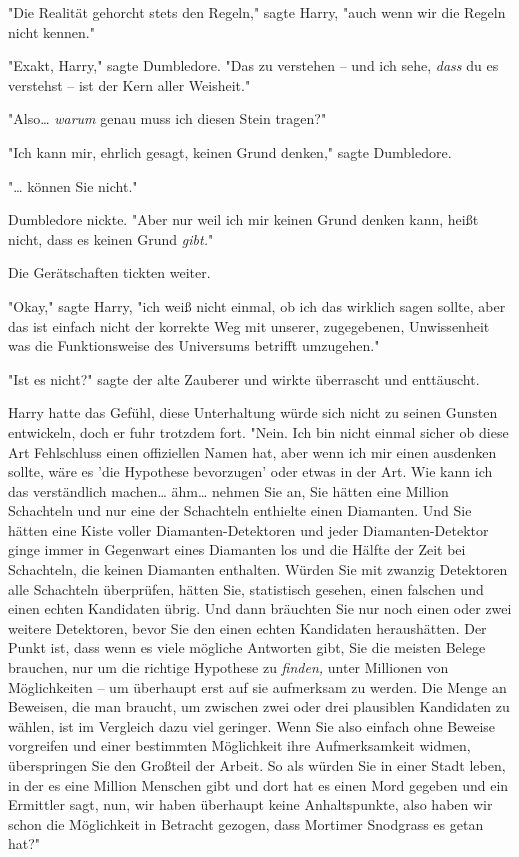{"Die Realität gehorcht stets den Regeln," sagte Harry, "auch wenn wir die Regeln nicht kennen."

"Exakt, Harry," sagte Dumbledore. "Das zu verstehen -- und ich sehe, \emph{dass} du es verstehst -- ist der Kern aller Weisheit."

"Also… \emph{warum} genau muss ich diesen Stein tragen?"

"Ich kann mir, ehrlich gesagt, keinen Grund denken," sagte Dumbledore.

"… können Sie nicht."

Dumbledore nickte. "Aber nur weil ich mir keinen Grund denken kann, heißt nicht, dass es keinen Grund \emph{gibt.}"

Die Gerätschaften tickten weiter.

"Okay," sagte Harry, "ich weiß nicht einmal, ob ich das wirklich sagen sollte, aber das ist einfach nicht der korrekte Weg mit unserer, zugegebenen, Unwissenheit was die Funktionsweise des Universums betrifft umzugehen."

"Ist es nicht?" sagte der alte Zauberer und wirkte überrascht und enttäuscht.

Harry hatte das Gefühl, diese Unterhaltung würde sich nicht zu seinen Gunsten entwickeln, doch er fuhr trotzdem fort. "Nein. Ich bin nicht einmal sicher ob diese Art Fehlschluss einen offiziellen Namen hat, aber wenn ich mir einen ausdenken sollte, wäre es 'die Hypothese bevorzugen' oder etwas in der Art. Wie kann ich das verständlich machen… ähm… nehmen Sie an, Sie hätten eine Million Schachteln und nur eine der Schachteln enthielte einen Diamanten. Und Sie hätten eine Kiste voller Diamanten-Detektoren und jeder Diamanten-Detektor ginge immer in Gegenwart eines Diamanten los und die Hälfte der Zeit bei Schachteln, die keinen Diamanten enthalten. Würden Sie mit zwanzig Detektoren alle Schachteln überprüfen, hätten Sie, statistisch gesehen, einen falschen und einen echten Kandidaten übrig. Und dann bräuchten Sie nur noch einen oder zwei weitere Detektoren, bevor Sie den einen echten Kandidaten heraushätten. Der Punkt ist, dass wenn es viele mögliche Antworten gibt, Sie die meisten Belege brauchen, nur um die richtige Hypothese zu \emph{finden,} unter Millionen von Möglichkeiten -- um überhaupt erst auf sie aufmerksam zu werden. Die Menge an Beweisen, die man braucht, um zwischen zwei oder drei plausiblen Kandidaten zu wählen, ist im Vergleich dazu viel geringer. Wenn Sie also einfach ohne Beweise vorgreifen und einer bestimmten Möglichkeit ihre Aufmerksamkeit widmen, überspringen Sie den Großteil der Arbeit. So als würden Sie in einer Stadt leben, in der es eine Million Menschen gibt und dort hat es einen Mord gegeben und ein Ermittler sagt, nun, wir haben überhaupt keine Anhaltspunkte, also haben wir schon die Möglichkeit in Betracht gezogen, dass Mortimer Snodgrass es getan hat?"

}
